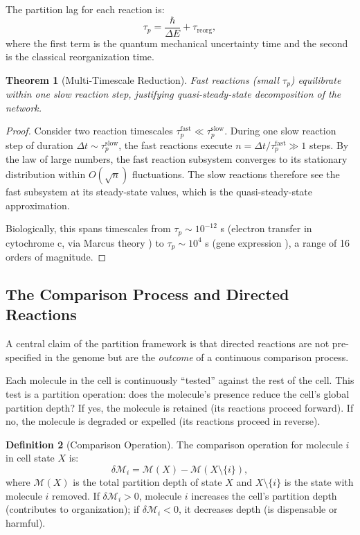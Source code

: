 \documentclass[twocolumn,10pt,a4paper]{article}
\newtheorem{theorem}{Theorem}[section]
\theoremstyle{definition}
\newtheorem{definition}[theorem]{Definition}
\theoremstyle{remark}
\newcommand{\Depth}{\mathcal{M}}
\newcommand{\taup}{\tau_p}
\begin{document}
The partition lag for each reaction is:
\begin{equation}
    \taup = \frac{\hbar}{\Delta E} + \tau_{\mathrm{reorg}},
    \label{eq:partition_lag_full}
\end{equation}
where the first term is the quantum mechanical uncertainty time and the second is the classical reorganization time.

\begin{theorem}[Multi-Timescale Reduction]
\label{thm:multiscale}
Fast reactions (small $\taup$) equilibrate within one slow reaction step, justifying quasi-steady-state decomposition of the network.
\end{theorem}

\begin{proof}
Consider two reaction timescales $\taup^{\mathrm{fast}} \ll \taup^{\mathrm{slow}}$. During one slow reaction step of duration $\Delta t \sim \taup^{\mathrm{slow}}$, the fast reactions execute $n = \Delta t / \taup^{\mathrm{fast}} \gg 1$ steps. By the law of large numbers, the fast reaction subsystem converges to its stationary distribution within $O(\sqrt{n})$ fluctuations. The slow reactions therefore see the fast subsystem at its steady-state values, which is the quasi-steady-state approximation.

Biologically, this spans timescales from $\taup \sim 10^{-12}$ s (electron transfer in cytochrome c, via Marcus theory \citep{Marcus1956}) to $\taup \sim 10^{4}$ s (gene expression \citep{Elowitz2002}), a range of 16 orders of magnitude.
\end{proof}

\subsection{The Comparison Process and Directed Reactions}

A central claim of the partition framework is that directed reactions are not pre-specified in the genome but are the \emph{outcome} of a continuous comparison process.

Each molecule in the cell is continuously ``tested'' against the rest of the cell. This test is a partition operation: does the molecule's presence reduce the cell's global partition depth? If yes, the molecule is retained (its reactions proceed forward). If no, the molecule is degraded or expelled (its reactions proceed in reverse).

\begin{definition}[Comparison Operation]
\label{def:comparison}
The comparison operation for molecule $i$ in cell state $X$ is:
\begin{equation}
    \delta\Depth_i = \Depth(X) - \Depth(X \setminus \{i\}),
    \label{eq:comparison}
\end{equation}
where $\Depth(X)$ is the total partition depth of state $X$ and $X \setminus \{i\}$ is the state with molecule $i$ removed. If $\delta\Depth_i > 0$, molecule $i$ increases the cell's partition depth (contributes to organization); if $\delta\Depth_i < 0$, it decreases depth (is dispensable or harmful).
\end{definition}
\end{document}
